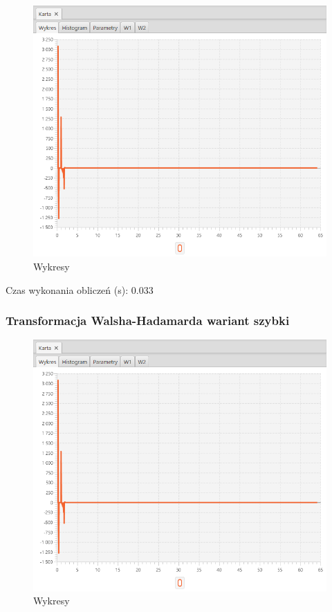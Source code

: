 \documentclass[12pt]{article}
\begin{document}
{{{                \begin{figure}[H]
                    \centering
                    \includegraphics[width=\textwidth]{img/result/s1/06/data_draw_6_sinus_sampling_trans_s1_data_205710.png}
                    \caption{Wykresy}
                \end{figure}

                Czas wykonania obliczeń (s): 0.033
            }
            \newpage

            \subsubsection{Transformacja Walsha-Hadamarda wariant szybki} {

                \begin{figure}[H]
                    \centering
                    \includegraphics[width=\textwidth]{img/result/s1/07/data_draw_7_sinus_sampling_trans_s1_data_205719.png}
                    \caption{Wykresy}
                \end{figure}

}}}
\end{document}
